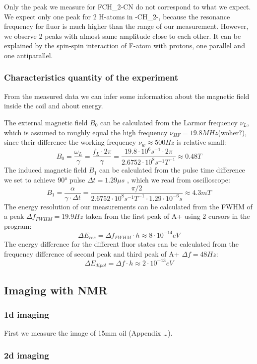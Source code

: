 Only the peak we measure for FCH\_2-CN do not correspond to what we
expect. We expect only one peak for 2 H-atoms in -CH\_2-, because the
resonance frequency for fluor is much higher than the range of our
measurement. However, we observe 2 peaks with almost same amplitude
close to each other. It can be explained by the spin-spin interaction of
F-atom with protons, one parallel and one antiparallel.

\subsubsection{Characteristics quantity of the experiment}\label{characteristics}

From the measured data we can infer some information about the magnetic
field inside the coil and about energy.

The external magnetic field \(B_0\) can be calculated from the Larmor
frequency \(\nu_L\), which is assumed to roughly equal the high
frequency \(\nu_{HF}=19.8 MHz\)(woher?), since their difference the
working frequency \(\nu_w\approx 500 Hz\) is relative small: \[
B_0 =\frac{\omega_L}{\gamma}=\frac{f_L \cdot 2 \pi}{\gamma}=\frac{19.8\cdot 10^6s^{-1}\cdot 2 \pi}{2.6752\cdot10^8 s^{-1}T^{-1}}\approx 0.48 T
\] The induced magnetic field \(B_1\) can be calculated from the pulse
time difference we set to achieve 90° pulse \(\Delta t=1.29\mu s\) ,
which we read from oscilloscope: \[
B_1 = \frac{\alpha}{\gamma\cdot\Delta t}=\frac{\pi/2}{2.6752\cdot10^8 s^{-1}T^{-1}\cdot 1.29\cdot10^{-6}s}\approx 4.3 mT
\] The energy resolution of our measurements can be calculated from the
FWHM of a peak \(\Delta f_{FWHM}=19.9 Hz\) taken from the first peak of
A+ using 2 cursors in the program: \[
\Delta E_{res} = \Delta f_{FWHM} \cdot h \approx 8\cdot10^{-14} eV
\] The energy difference for the different fluor states can be
calculated from the frequency difference of second peak and third peak
of A+ \(\Delta f=48 Hz\): \[
\Delta E_{dipol}=\Delta f \cdot h\approx 2\cdot10^{-13} eV
\]

\subsection{Imaging with NMR}\label{imaging-with-nmr}

\subsubsection{1d imaging}\label{d-imaging}

First we measure the image of 15mm oil (Appendix \ldots{}).

\subsubsection{2d imaging}\label{d-imaging-1}